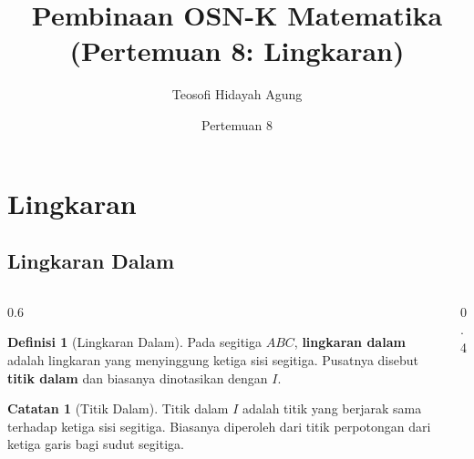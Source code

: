 \documentclass[aspectratio=169]{beamer}
\date{Pertemuan 8}
\title[OSN-K Matematika - Geometri]{Pembinaan OSN-K Matematika\\(Pertemuan 8: Lingkaran)}
\author[Tetew]{Teosofi Hidayah Agung}
\institute[MAN 1 Pasuruan]{MAN 1 Pasuruan}
\theoremstyle{definition}
\newtheorem{definisi}{Definisi}
\newtheorem{catatan}{Catatan}
\begin{document}
\begin{frame}
  \titlepage
\end{frame}


\section{Lingkaran}
\subsection{Lingkaran Dalam}
\begin{frame}{\insertsection}{\insertsubsection}
  \begin{columns}[T]
    \begin{column}{0.6\textwidth}
      \begin{definisi}[Lingkaran Dalam]
        Pada segitiga $ABC$, \textbf{lingkaran dalam} adalah lingkaran yang menyinggung ketiga sisi segitiga. Pusatnya disebut \textbf{titik dalam} dan biasanya dinotasikan dengan $I$.
      \end{definisi}
      \begin{catatan}[Titik Dalam]
        Titik dalam $I$ adalah titik yang berjarak sama terhadap ketiga sisi segitiga. Biasanya diperoleh dari titik perpotongan dari ketiga garis bagi sudut segitiga.
      \end{catatan}
    \end{column}
    \begin{column}{0.4\textwidth}
      \begin{center}
\end{center}
\end{column}
\end{columns}
\end{frame}
\end{document}
